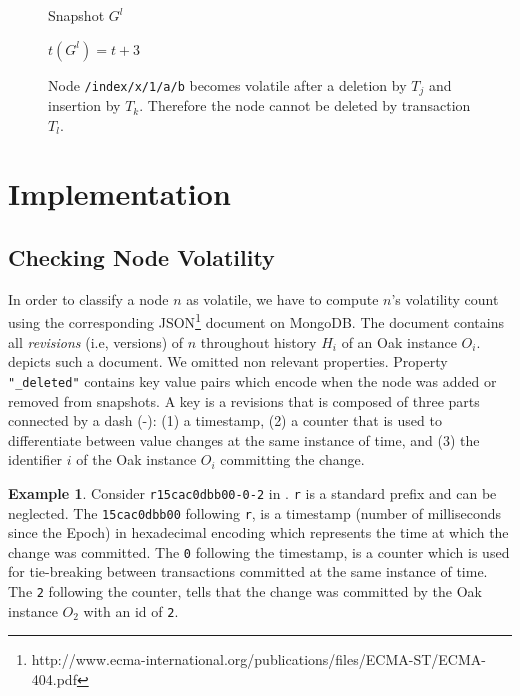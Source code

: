 \documentclass[abstracton,12pt]{scrartcl}
\theoremstyle{definition}
\newtheorem{example}{Example}
\begin{document}
\begin{figure}[h]
\begin{scriptsize}
\begin{multicols}{4}
\begin{center}
{                    \vspace{27mm}
                }

                Snapshot $G^l$

                $t(G^l) = t + 3$
            \end{center}
        \end{multicols}
    \end{scriptsize}
    \caption{Node \texttt{/index/x/1/a/b} becomes volatile after a deletion by $T_j$ and insertion by $T_k$. Therefore the node cannot be deleted by transaction $T_l$.}
    \label{fig:vol_example}
\end{figure}

\section{Implementation}

\subsection{Checking Node Volatility}

In order to classify a node $n$ as volatile, we have to compute $n$'s volatility count using the corresponding JSON\footnote{http://www.ecma-international.org/publications/files/ECMA-ST/ECMA-404.pdf} document on MongoDB.
The document contains all \textit{revisions} (i.e, versions) of $n$ throughout history $H_i$ of an Oak instance $O_i$.
 depicts such a document.
We omitted non relevant properties.
Property \texttt{"\_deleted"} contains key value pairs which encode when the node was added or removed from snapshots.
A key is a revisions that is composed of three parts connected by a dash (-): (1) a timestamp, (2) a counter that is used to differentiate between value changes at the same instance of time, and (3) the identifier $i$ of the Oak instance $O_i$ committing the change.
\begin{example}
    Consider \texttt{r15cac0dbb00-0-2} in .
    \texttt{r} is a standard prefix and can be neglected.
    The \texttt{15cac0dbb00} following \texttt{r}, is a timestamp (number of milliseconds since the Epoch) in hexadecimal encoding which represents the time at which the change was committed.
    The \texttt{0} following the timestamp, is a counter which is used for tie-breaking between transactions committed at the same instance of time.
    The \texttt{2} following the counter, tells that the change was committed by the Oak instance $O_2$ with an id of \texttt{2}.
\end{example}
\end{document}
